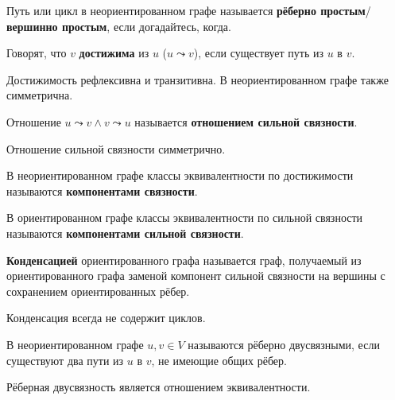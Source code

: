 \documentclass{article}
\begin{document}
    \begin{definition}
        Путь или цикл в неориентированном графе называется \textbf{рёберно простым}/\textbf{вершинно простым}, если догадайтесь, когда.
    \end{definition}
    \begin{definition}
        Говорят, что $v$ \textbf{достижима} из $u$ ($u\leadsto v$), если существует путь из $u$ в $v$.
    \end{definition}
    \begin{claim}
        Достижимость рефлексивна и транзитивна. В неориентированном графе также симметрична.
    \end{claim}
    \begin{definition}
        Отношение $u\leadsto v\land v\leadsto u$ называется \textbf{отношением сильной связности}.
    \end{definition}
    \begin{claim}
        Отношение сильной связности симметрично.
    \end{claim}
    \begin{definition}
        В неориентированном графе классы эквивалентности по достижимости называются \textbf{компонентами связности}.
    \end{definition}
    \begin{definition}
        В ориентированном графе классы эквивалентности по сильной связности называются \textbf{компонентами сильной связности}.
    \end{definition}
    \begin{definition}
        \textbf{Конденсацией} ориентированного графа называется граф, получаемый из ориентированного графа заменой компонент сильной связности на вершины с сохранением ориентированных рёбер.
    \end{definition}
    \begin{claim}
        Конденсация всегда не содержит циклов.
    \end{claim}
    \begin{definition}
        В неориентированном графе $u,v\in V$ называются рёберно двусвязными, если существуют два пути из $u$ в $v$, не имеющие общих рёбер.
    \end{definition}
    \begin{claim}
        Рёберная двусвязность является отношением эквивалентности.
    \end{claim}
\end{document}
